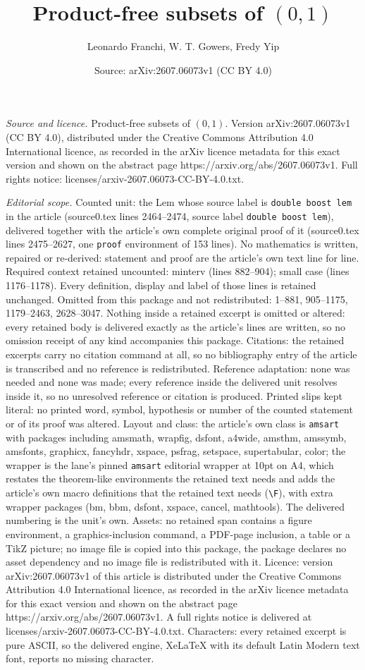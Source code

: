 \documentclass[10pt,a4paper]{amsart}
\title[Product-free subsets of $(0,1)$]{Product-free subsets of $(0,1)$}
\author{Leonardo Franchi, W. T. Gowers, Fredy Yip}
\date{Source: arXiv:2607.06073v1 (CC BY 4.0)}
\begin{document}
\maketitle

\noindent\emph{Source and licence.} Product-free subsets of $(0,1)$. Version arXiv:2607.06073v1 (CC BY 4.0), distributed under the Creative Commons Attribution 4.0 International licence, as recorded in the arXiv licence metadata for this exact version and shown on the abstract page https://arxiv.org/abs/2607.06073v1. Full rights notice: licenses/arxiv-2607.06073-CC-BY-4.0.txt.\par\smallskip

\noindent\textit{Editorial scope.} Counted unit: the Lem whose source label is \texttt{double boost lem} in the article (source0.tex lines 2464--2474, source label \texttt{double boost lem}), delivered together with the article's own complete original proof of it (source0.tex lines 2475--2627, one \texttt{proof} environment of 153 lines). No mathematics is written, repaired or re-derived: statement and proof are the article's own text line for line. Required context retained uncounted: minterv (lines 882--904); small case (lines 1176--1178). Every definition, display and label of those lines is retained unchanged. Omitted from this package and not redistributed: 1--881, 905--1175, 1179--2463, 2628--3047. Nothing inside a retained excerpt is omitted or altered: every retained body is delivered exactly as the article's lines are written, so no omission receipt of any kind accompanies this package. Citations: the retained excerpts carry no citation command at all, so no bibliography entry of the article is transcribed and no reference is redistributed. Reference adaptation: none was needed and none was made; every reference inside the delivered unit resolves inside it, so no unresolved reference or citation is produced. Printed slips kept literal: no printed word, symbol, hypothesis or number of the counted statement or of its proof was altered. Layout and class: the article's own class is \texttt{amsart} with packages including amsmath, wrapfig, dsfont, a4wide, amsthm, amssymb, amsfonts, graphicx, fancyhdr, xspace, psfrag, setspace, supertabular, color; the wrapper is the lane's pinned \texttt{amsart} editorial wrapper at 10pt on A4, which restates the theorem-like environments the retained text needs and adds the article's own macro definitions that the retained text needs (\texttt{\textbackslash F}), with extra wrapper packages (bm, bbm, dsfont, xspace, cancel, mathtools). The delivered numbering is the unit's own. Assets: no retained span contains a figure environment, a graphics-inclusion command, a PDF-page inclusion, a table or a TikZ picture; no image file is copied into this package, the package declares no asset dependency and no image file is redistributed with it. Licence: version arXiv:2607.06073v1 of this article is distributed under the Creative Commons Attribution 4.0 International licence, as recorded in the arXiv licence metadata for this exact version and shown on the abstract page https://arxiv.org/abs/2607.06073v1. A full rights notice is delivered at licenses/arxiv-2607.06073-CC-BY-4.0.txt. Characters: every retained excerpt is pure ASCII, so the delivered engine, XeLaTeX with its default Latin Modern text font, reports no missing character.
\end{document}

